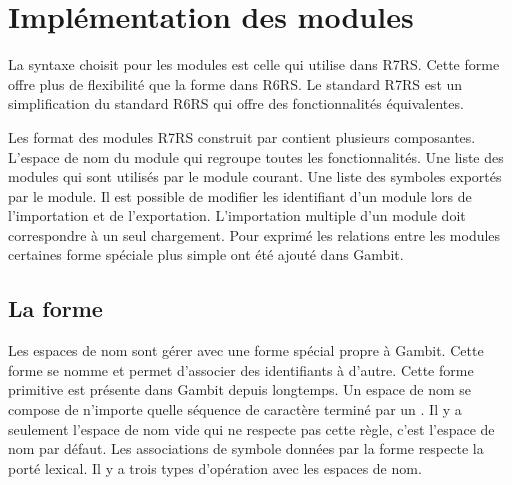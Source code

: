 
\chapter{Implémentation des modules}

La syntaxe choisit pour les modules est celle qui utilise 
dans R7RS. Cette forme offre plus de flexibilité que la forme  dans
R6RS. Le standard R7RS est un simplification du standard R6RS qui offre des
fonctionnalités équivalentes.

Les format des modules R7RS construit par  contient
plusieurs composantes. L'espace de nom du module qui regroupe toutes les
fonctionnalités. Une liste des modules qui sont utilisés par le module courant.
Une liste des symboles exportés par le module. Il est possible de modifier les
identifiant d'un module lors de l'importation et de l'exportation. L'importation
multiple d'un module doit correspondre à un seul chargement.
Pour exprimé les relations entre les modules certaines forme
spéciale plus simple ont été ajouté dans Gambit.



\section{La forme }

Les espaces de nom sont gérer avec une forme spécial propre à Gambit. Cette
forme se nomme  et permet d'associer des identifiants à
d'autre.  Cette forme primitive est présente dans Gambit depuis longtemps.  Un
espace de nom se compose de n'importe quelle séquence de caractère terminé par
un \lstcode{#}. Il y a seulement l'espace de nom vide qui ne respecte pas cette
règle, c'est l'espace de nom par défaut.  Les associations de symbole données
par la forme  respecte la porté lexical. Il y a trois
types d'opération avec les espaces de nom.

